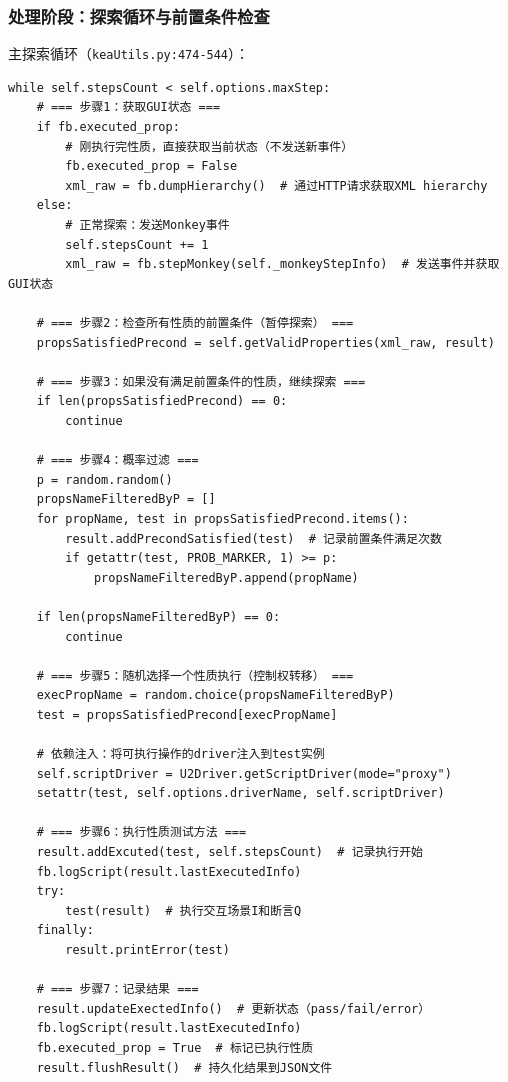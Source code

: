 \documentclass[a4paper, zihao=-4]{ctexart}
\newcommand{\bff}[1]{{\heiti #1}}
\begin{document}
\subsubsection{处理阶段：探索循环与前置条件检查}

\bff{主探索循环}（\texttt{keaUtils.py:474-544}）：

\begin{lstlisting}
while self.stepsCount < self.options.maxStep:
    # === 步骤1：获取GUI状态 ===
    if fb.executed_prop:
        # 刚执行完性质，直接获取当前状态（不发送新事件）
        fb.executed_prop = False
        xml_raw = fb.dumpHierarchy()  # 通过HTTP请求获取XML hierarchy
    else:
        # 正常探索：发送Monkey事件
        self.stepsCount += 1
        xml_raw = fb.stepMonkey(self._monkeyStepInfo)  # 发送事件并获取GUI状态
    
    # === 步骤2：检查所有性质的前置条件（暂停探索） ===
    propsSatisfiedPrecond = self.getValidProperties(xml_raw, result)
    
    # === 步骤3：如果没有满足前置条件的性质，继续探索 ===
    if len(propsSatisfiedPrecond) == 0:
        continue
    
    # === 步骤4：概率过滤 ===
    p = random.random()
    propsNameFilteredByP = []
    for propName, test in propsSatisfiedPrecond.items():
        result.addPrecondSatisfied(test)  # 记录前置条件满足次数
        if getattr(test, PROB_MARKER, 1) >= p:
            propsNameFilteredByP.append(propName)
    
    if len(propsNameFilteredByP) == 0:
        continue
    
    # === 步骤5：随机选择一个性质执行（控制权转移） ===
    execPropName = random.choice(propsNameFilteredByP)
    test = propsSatisfiedPrecond[execPropName]
    
    # 依赖注入：将可执行操作的driver注入到test实例
    self.scriptDriver = U2Driver.getScriptDriver(mode="proxy")
    setattr(test, self.options.driverName, self.scriptDriver)
    
    # === 步骤6：执行性质测试方法 ===
    result.addExcuted(test, self.stepsCount)  # 记录执行开始
    fb.logScript(result.lastExecutedInfo)
    try:
        test(result)  # 执行交互场景I和断言Q
    finally:
        result.printError(test)
    
    # === 步骤7：记录结果 ===
    result.updateExectedInfo()  # 更新状态（pass/fail/error）
    fb.logScript(result.lastExecutedInfo)
    fb.executed_prop = True  # 标记已执行性质
    result.flushResult()  # 持久化结果到JSON文件
\end{lstlisting}
\end{document}
